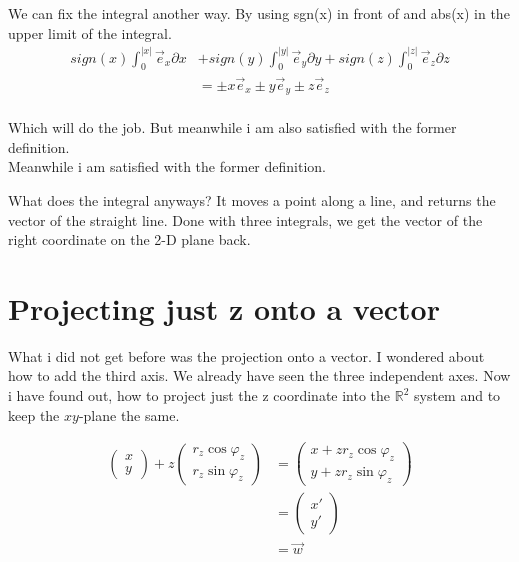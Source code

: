 \documentclass[a4paper]{article}
\begin{document}
\begin{Example}
We can fix the integral another way. By using sgn(x) in front of and abs(x) in the upper limit of the integral.\\

\begin{displaymath}
\begin{align}
sign(x)\int_{0}^{|x|}\vec{e}_{x}\partial{x} &+
sign(y)\int_{0}^{|y|}\vec{e}_{y}\partial{y} +
sign(z)\int_{0}^{|z|}\vec{e}_{z}\partial{z} \\
&= \pm{x}\vec{e}_{x} \pm{y}\vec{e}_{y} \pm{z}\vec{e}_{z}\\
\end{align}
\end{displaymath}

Which will do the job. But meanwhile i am also satisfied with the former definition.\\Meanwhile i am satisfied with the former definition.


What does the integral anyways? It moves a point along a line, and returns the vector of the straight line. Done with three integrals, we get the vector of the right coordinate on the 2-D plane back.\\



\section{Projecting just z onto a vector}

\label{projecting_just_z}
What i did not get before was the projection onto a vector. I wondered about how to add the third axis. We already have seen the three independent axes. Now i have found out, how to project just the z coordinate into the $\mathbb{R}^{2}$ system and to keep the $xy$-plane the same. 

\begin{displaymath}
\begin{align}
\begin{pmatrix}x\\y\end{pmatrix} + z\begin{pmatrix}r_z\cos\varphi_z\\r_z\sin\varphi_z\end{pmatrix} &= \begin{pmatrix}x+zr_{z}\cos\varphi_z\\y+zr_{z}\sin\varphi_z\end{pmatrix}\\ &= \begin{pmatrix}x'\\y'\end{pmatrix}\\ &= \vec{w}
\end{align}
\end{displaymath}


\end{Example}
\end{document}
